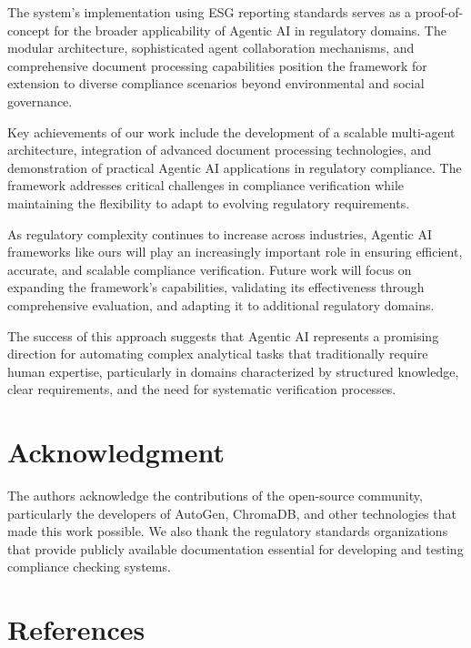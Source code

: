 \documentclass[conference]{IEEEtran}
\begin{document}
The system's implementation using ESG reporting standards serves as a proof-of-concept for the broader applicability of Agentic AI in regulatory domains. The modular architecture, sophisticated agent collaboration mechanisms, and comprehensive document processing capabilities position the framework for extension to diverse compliance scenarios beyond environmental and social governance.

Key achievements of our work include the development of a scalable multi-agent architecture, integration of advanced document processing technologies, and demonstration of practical Agentic AI applications in regulatory compliance. The framework addresses critical challenges in compliance verification while maintaining the flexibility to adapt to evolving regulatory requirements.

As regulatory complexity continues to increase across industries, Agentic AI frameworks like ours will play an increasingly important role in ensuring efficient, accurate, and scalable compliance verification. Future work will focus on expanding the framework's capabilities, validating its effectiveness through comprehensive evaluation, and adapting it to additional regulatory domains.

The success of this approach suggests that Agentic AI represents a promising direction for automating complex analytical tasks that traditionally require human expertise, particularly in domains characterized by structured knowledge, clear requirements, and the need for systematic verification processes.

\section*{Acknowledgment}

The authors acknowledge the contributions of the open-source community, particularly the developers of AutoGen, ChromaDB, and other technologies that made this work possible. We also thank the regulatory standards organizations that provide publicly available documentation essential for developing and testing compliance checking systems.

\section*{References}
\end{document}
